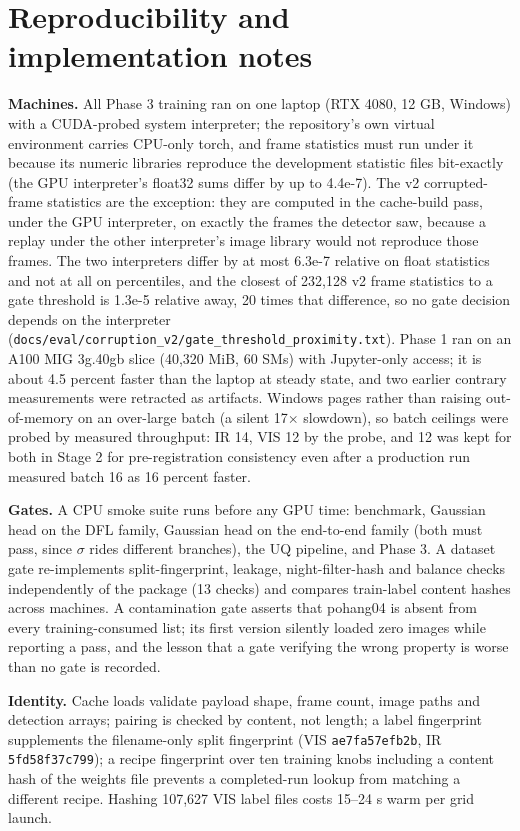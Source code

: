 \documentclass[10pt]{article}
\begin{document}
\section{Reproducibility and implementation notes}\label{app:M}
\textbf{Machines.} All Phase 3 training ran on one laptop (RTX 4080, 12 GB, Windows) with a CUDA-probed system interpreter; the repository's own virtual environment carries CPU-only torch, and frame statistics must run under it because its numeric libraries reproduce the development statistic files bit-exactly (the GPU interpreter's float32 sums differ by up to 4.4e-7). The v2 corrupted-frame statistics are the exception: they are computed in the cache-build pass, under the GPU interpreter, on exactly the frames the detector saw, because a replay under the other interpreter's image library would not reproduce those frames. The two interpreters differ by at most 6.3e-7 relative on float statistics and not at all on percentiles, and the closest of 232,128 v2 frame statistics to a gate threshold is 1.3e-5 relative away, 20 times that difference, so no gate decision depends on the interpreter (\texttt{docs/\allowbreak{}eval/\allowbreak{}corruption\_\allowbreak{}v2/\allowbreak{}gate\_\allowbreak{}threshold\_\allowbreak{}proximity.txt}). Phase 1 ran on an A100 MIG 3g.40gb slice (40,320 MiB, 60 SMs) with Jupyter-only access; it is about 4.5 percent faster than the laptop at steady state, and two earlier contrary measurements were retracted as artifacts. Windows pages rather than raising out-of-memory on an over-large batch (a silent 17$\times$ slowdown), so batch ceilings were probed by measured throughput: IR 14, VIS 12 by the probe, and 12 was kept for both in Stage 2 for pre-registration consistency even after a production run measured batch 16 as 16 percent faster.

\textbf{Gates.} A CPU smoke suite runs before any GPU time: benchmark, Gaussian head on the DFL family, Gaussian head on the end-to-end family (both must pass, since $\sigma$ rides different branches), the UQ pipeline, and Phase 3. A dataset gate re-implements split-fingerprint, leakage, night-filter-hash and balance checks independently of the package (13 checks) and compares train-label content hashes across machines. A contamination gate asserts that pohang04 is absent from every training-consumed list; its first version silently loaded zero images while reporting a pass, and the lesson that a gate verifying the wrong property is worse than no gate is recorded.

\textbf{Identity.} Cache loads validate payload shape, frame count, image paths and detection arrays; pairing is checked by content, not length; a label fingerprint supplements the filename-only split fingerprint (VIS \texttt{ae7fa57efb2b}, IR \texttt{5fd58f37c799}); a recipe fingerprint over ten training knobs including a content hash of the weights file prevents a completed-run lookup from matching a different recipe. Hashing 107,627 VIS label files costs 15--24 s warm per grid launch.
\end{document}
